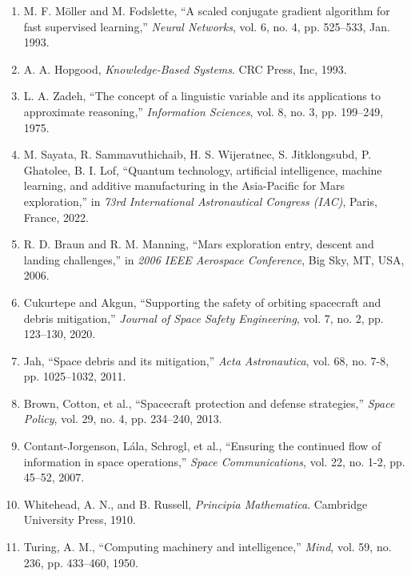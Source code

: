 \documentclass[a4paper,12pt]{article}
\begin{document}
\begin{enumerate}
    \item M. F. Möller and M. Fodslette, “A scaled conjugate gradient algorithm for fast supervised learning,” \textit{Neural Networks}, vol. 6, no. 4, pp. 525–533, Jan. 1993.
    
    \item A. A. Hopgood, \textit{Knowledge-Based Systems}. CRC Press, Inc, 1993.
    
    \item L. A. Zadeh, “The concept of a linguistic variable and its applications to approximate reasoning,” \textit{Information Sciences}, vol. 8, no. 3, pp. 199–249, 1975.
    
    \item M. Sayata, R. Sammavuthichaib, H. S. Wijeratnec, S. Jitklongsubd, P. Ghatolee, B. I. Lof, “Quantum technology, artificial intelligence, machine learning, and additive manufacturing in the Asia-Pacific for Mars exploration,” in \textit{73rd International Astronautical Congress (IAC)}, Paris, France, 2022.
    
    \item R. D. Braun and R. M. Manning, “Mars exploration entry, descent and landing challenges,” in \textit{2006 IEEE Aerospace Conference}, Big Sky, MT, USA, 2006.
    
    \item Cukurtepe and Akgun, “Supporting the safety of orbiting spacecraft and debris mitigation,” \textit{Journal of Space Safety Engineering}, vol. 7, no. 2, pp. 123–130, 2020.
    
    \item Jah, “Space debris and its mitigation,” \textit{Acta Astronautica}, vol. 68, no. 7-8, pp. 1025–1032, 2011.
    
    \item Brown, Cotton, et al., “Spacecraft protection and defense strategies,” \textit{Space Policy}, vol. 29, no. 4, pp. 234–240, 2013.
    
    \item Contant-Jorgenson, Lála, Schrogl, et al., “Ensuring the continued flow of information in space operations,” \textit{Space Communications}, vol. 22, no. 1-2, pp. 45–52, 2007.
    
    \item Whitehead, A. N., and B. Russell, \textit{Principia Mathematica}. Cambridge University Press, 1910.
    
    \item Turing, A. M., “Computing machinery and intelligence,” \textit{Mind}, vol. 59, no. 236, pp. 433–460, 1950.
    

\end{enumerate}
\end{document}
